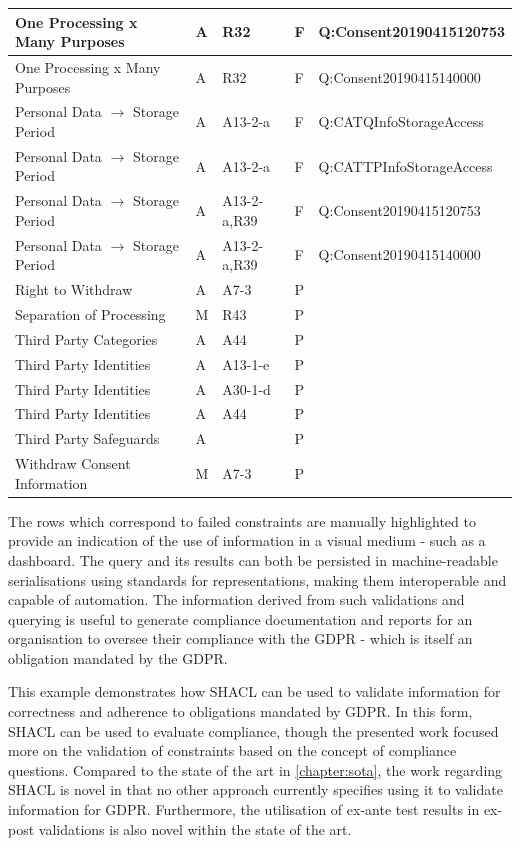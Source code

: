 \begin{center}
\begin{tabularx}{\linewidth}{|l|X|X|X|l|}
\rowcolor{lightred} One Processing x Many Purposes & A & R32 & F & Q:Consent20190415120753 \\ \hline
\rowcolor{lightred} One Processing x Many Purposes & A & R32 & F & Q:Consent20190415140000 \\ \hline
\rowcolor{lightred} Personal Data $\rightarrow$ Storage Period & A & A13-2-a & F & Q:CATQInfoStorageAccess \\ \hline
\rowcolor{lightred} Personal Data $\rightarrow$ Storage Period & A & A13-2-a & F & Q:CATTPInfoStorageAccess \\ \hline
\rowcolor{lightred} Personal Data $\rightarrow$ Storage Period & A & A13-2-a,R39 & F & Q:Consent20190415120753 \\ \hline
\rowcolor{lightred} Personal Data $\rightarrow$ Storage Period & A & A13-2-a,R39 & F & Q:Consent20190415140000 \\ \hline
Right to Withdraw & A & A7-3 & P &  \\ \hline
Separation of Processing & M & R43 & P &  \\ \hline
Third Party Categories & A & A44 & P &  \\ \hline
Third Party Identities & A & A13-1-e & P &  \\ \hline
Third Party Identities & A & A30-1-d & P &  \\ \hline
Third Party Identities & A & A44 & P &  \\ \hline
Third Party Safeguards & A &  & P &  \\ \hline
Withdraw Consent Information & M & A7-3 & P &  \\
\bottomrule
\end{tabularx}
\end{center}

The rows which correspond to failed constraints are manually highlighted to provide an indication of the use of information in a visual medium - such as a dashboard.
The query and its results can both be persisted in machine-readable serialisations using standards for representations, making them interoperable and capable of automation.
The information derived from such validations and querying is useful to generate compliance documentation and reports for an organisation to oversee their compliance with the GDPR - which is itself an obligation mandated by the GDPR.

This example demonstrates how SHACL can be used to validate information for correctness and adherence to obligations mandated by GDPR. In this form, SHACL can be used to evaluate compliance, though the presented work focused more on the validation of constraints based on the concept of compliance questions.
Compared to the state of the art in \autoref{chapter:sota}, the work regarding SHACL is novel in that no other approach currently specifies using it to validate information for GDPR.
Furthermore, the utilisation of ex-ante test results in ex-post validations is also novel within the state of the art.



